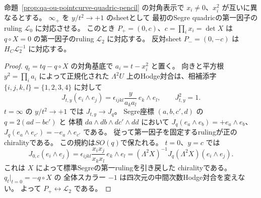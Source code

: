 \begin{lemma}[Hodge対合によるOUのruling符号]
\label{lem:qa-ou-hodge-ruling-sign}
命題~\ref{prop:qa-ou-pointcurve-quadric-pencil} の対角表示で
$x_i\ne0$、$x_i^2$ が互いに異なるとする。
$\infty_+$ を $y/t^2\to+1$ のsheetとして
最初のSegre quadricの第一因子のruling $\mathcal L_0$ に対応させる。
このとき $P_+=(0,c)$、$c=\prod_i x_i=\det X$ は
$q\circ X=0$ の第一因子のruling $\mathcal L_2$ に対応する。
反対sheet $P_-=(0,-c)$ は $H_C\mathcal L_2^{-1}$ に対応する。
\end{lemma}
\begin{proof}
$q_t=tq-q\circ X$ の対角基底で $a_i=t-x_i^2$ と置く。
向きと平方根 $y^2=\prod_i a_i$ によって正規化された
$\Lambda^2U$ 上のHodge対合は、相補添字 $\{i,j,k,l\}=\{1,2,3,4\}$
に対して
\[
 J_{t,y}(e_i\wedge e_j)=
   \epsilon_{ijkl}\frac{y}{a_ka_l}\,e_k\wedge e_l,
 \qquad J_{t,y}^2=1.
 \tag{OU-Hodge}\label{eq:qa-ou-hodge-normalization}
\]
$t=\infty$ の $y/t^2\to+1$ では $J_{t,y}\to J_q$。
Segre座標 $(a,b,c',d)$ の $q=2(ad-bc')$ と
体積 $da\wedge db\wedge dc'\wedge dd$ において
$J_q(e_a\wedge e_b)=+e_a\wedge e_b$、
$J_q(e_a\wedge e_{c'})=-e_a\wedge e_{c'}$ である。
従って第一因子を固定するrulingが正のchiralityである。
この規約は$SO(q)$で保たれる。
$t=0$、$y=c$ では
\[
 J_{0,c}(e_i\wedge e_j)=
 \epsilon_{ijkl}\frac{x_ix_j}{x_kx_l}\,e_k\wedge e_l
 =(\Lambda^2X)^{-1}J_q(\Lambda^2X)(e_i\wedge e_j).
 \tag{OU-Hodge-0}\label{eq:qa-ou-hodge-zero}
\]
これは $X$ によって標準Segreの第一rulingを引き戻した
chiralityである。$q_t|_{t=0}=-q\circ X$ の
全体スカラー $-1$ は四次元の中間次数Hodge対合を変えない。
よって $P_+\leftrightarrow\mathcal L_2$ である。
\end{proof}

